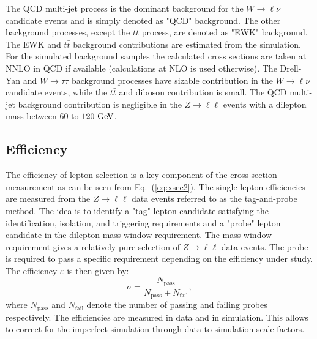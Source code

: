 The QCD multi-jet process is the dominant background for the $W \rightarrow \ell\nu$ candidate events and is simply denoted as "QCD" background.  The other background processes, except the $t\bar{t}$ process, are denoted as "EWK" background. The EWK and $t\bar{t}$ background contributions are estimated from the simulation. For the simulated background samples the calculated cross sections are taken at NNLO in QCD if available (calculations at NLO is used otherwise). The  Drell-Yan and $W\rightarrow \tau\tau$ background processes have sizable contribution in the $W \rightarrow \ell\nu$ candidate events, while the $t\bar{t}$ and diboson contribution is small. The QCD multi-jet background contribution is negligible in the $Z \rightarrow \ell\ell$ events with a dilepton mass between $60$ to $120~\mathrm{Ge\kern -0.1em V}$.    

\subsection{Efficiency}

The efficiency of lepton selection is a key component of the cross section measurement as can be seen from Eq.~(\ref{eq:xsec2}). The single lepton efficiencies are measured from the $Z \rightarrow \ell\ell$ data events referred to as the tag-and-probe method. The idea is to identify a "tag" lepton candidate satisfying the identification, isolation, and triggering requirements and a "probe" lepton candidate in the dilepton mass window requirement. The mass window requirement gives a relatively pure selection of  $Z \rightarrow \ell\ell$ data events. The probe is required to pass a specific requirement depending on the efficiency under study. The efficiency $\varepsilon$ is then given by:
\begin{equation} \label{eq:eff}
\sigma = \frac{N_{\mathrm{pass}}}{N_{\mathrm{pass}}+N_{\mathrm{fail}}},
\end{equation}
where $N_{\mathrm{pass}}$ and $N_{\mathrm{fail}}$ denote the number of passing and failing probes respectively. The efficiencies are measured in data and in simulation. This allows to correct for the imperfect simulation through data-to-simulation scale factors.   

